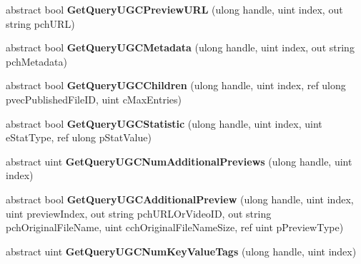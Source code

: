 \begin{DoxyCompactItemize}
\mbox{\label{class_valve_1_1_steamworks_1_1_i_steam_u_g_c_abe3456d64c7beb701b36e37ec5f10d9c}} 
abstract bool {\bfseries Get\+Query\+U\+G\+C\+Preview\+U\+RL} (ulong handle, uint index, out string pch\+U\+RL)
\item 
\mbox{\label{class_valve_1_1_steamworks_1_1_i_steam_u_g_c_a1b880ec071deb9c125da1cdfea02b791}} 
abstract bool {\bfseries Get\+Query\+U\+G\+C\+Metadata} (ulong handle, uint index, out string pch\+Metadata)
\item 
\mbox{\label{class_valve_1_1_steamworks_1_1_i_steam_u_g_c_a8df37156fe1feb67a21076f2750be29e}} 
abstract bool {\bfseries Get\+Query\+U\+G\+C\+Children} (ulong handle, uint index, ref ulong pvec\+Published\+File\+ID, uint c\+Max\+Entries)
\item 
\mbox{\label{class_valve_1_1_steamworks_1_1_i_steam_u_g_c_a710365d8762597ea4d23c593626f9364}} 
abstract bool {\bfseries Get\+Query\+U\+G\+C\+Statistic} (ulong handle, uint index, uint e\+Stat\+Type, ref ulong p\+Stat\+Value)
\item 
\mbox{\label{class_valve_1_1_steamworks_1_1_i_steam_u_g_c_a50725c7b13708a78b87c2de3d6c15453}} 
abstract uint {\bfseries Get\+Query\+U\+G\+C\+Num\+Additional\+Previews} (ulong handle, uint index)
\item 
\mbox{\label{class_valve_1_1_steamworks_1_1_i_steam_u_g_c_a5befb876873f5361e00f16269a65e73c}} 
abstract bool {\bfseries Get\+Query\+U\+G\+C\+Additional\+Preview} (ulong handle, uint index, uint preview\+Index, out string pch\+U\+R\+L\+Or\+Video\+ID, out string pch\+Original\+File\+Name, uint cch\+Original\+File\+Name\+Size, ref uint p\+Preview\+Type)
\item 
\mbox{\label{class_valve_1_1_steamworks_1_1_i_steam_u_g_c_a2bead6b375e18678c54acd30acde3128}} 
abstract uint {\bfseries Get\+Query\+U\+G\+C\+Num\+Key\+Value\+Tags} (ulong handle, uint index)
\item 
\mbox{\label{class_valve_1_1_steamworks_1_1_i_steam_u_g_c_a5c8f40c55a213405a692f5769ea47f52}} 

\end{DoxyCompactItemize}
